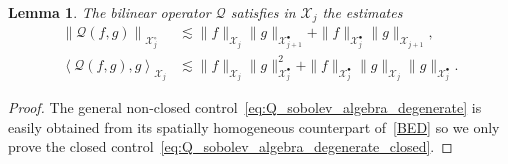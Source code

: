 \documentclass[10pt]{amsart}
\newtheorem{lemm}[theo]{Lemma}\newtheorem{prop}[theo]{Proposition}\newtheorem{coro}[theo]{Corollary}\newtheorem{conj}[theo]{Conjecture}
\theoremstyle{definition}\newtheorem{defi}[theo]{Definition}\newtheorem{rema}[theo]{Remark}\newtheorem{exam}[theo]{Example}\newtheorem{exem}[theo]{Example}\newtheorem{nota}[theo]{Notation}
\newcommand{\XX}{\mathcal{X}}
\newcommand{\QQ}{\mathcal{Q}}
\newcommand{\SSh}{\bm{\XX}}
\newcommand{\SShp}{\bm{\XX}^{\bullet}}
\newcommand{\SShm}{\bm{\XX}^{\circ}}
\newcommand{\lla}{\left\langle}
\newcommand{\rra}{\right\rangle}
\begin{document}
\begin{lemm}\label{lem72}
The bilinear operator $\QQ$ satisfies in $\SSh_j$ the estimates
\begin{align}
\left\| \QQ(f, g) \right\|_{ \SShm_j } &\lesssim \| f \|_{ \SSh_j } \| g \|_{ \SShp_{j+1} } + \| f \|_{ \SShp_j } \| g \|_{ \SSh_{j+1} },
\label{eq:Q_sobolev_algebra_degenerate}\\
\lla \QQ(f, g), g \rra_{ \SSh_j } &\lesssim \| f \|_{ \SSh_j } \| g \|_{ \SShp_j }^2 + \| f \|_{ \SShp_j } \| g \|_{ \SSh_j } \| g \|_{ \SShp_j }.
\label{eq:Q_sobolev_algebra_degenerate_closed}
\end{align}
\end{lemm}

\begin{proof}
The general non-closed control~\eqref{eq:Q_sobolev_algebra_degenerate} is easily obtained from its spatially homogeneous counterpart of~\eqref{BED} so we only prove the closed control~\eqref{eq:Q_sobolev_algebra_degenerate_closed}.


\end{proof}
\end{document}
